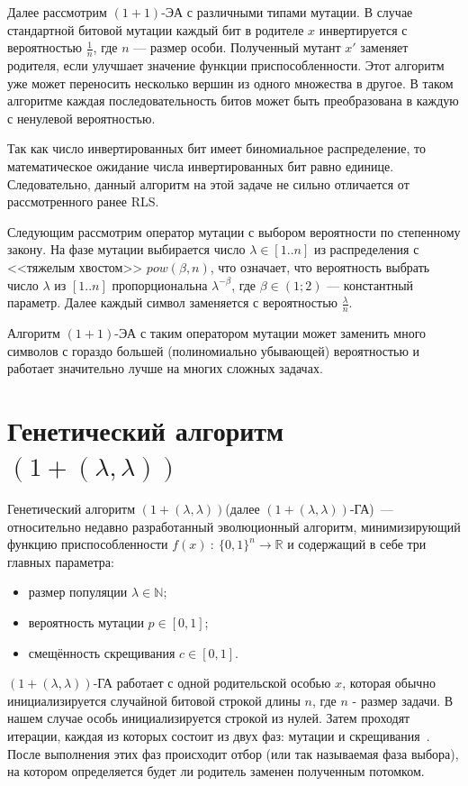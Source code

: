 \documentclass[times]{itmo-student-thesis}
\newcommand{\alglambda}{${(1 + (\lambda , \lambda))}$\xspace}
\newcommand{\alglambdaf}{${(1 + (\lambda , \lambda))}$-ГА\xspace}
\newcommand{\oea}{\mbox{$(1 + 1)$-ЭА}\xspace}
\newcommand{\N}{{\mathbb N}}
\newcommand{\R}{{\mathbb R}}
\begin{document}
Далее рассмотрим \oea с различными типами мутации. В случае стандартной битовой мутации каждый бит в родителе $x$ инвертируется с вероятностью $\frac{1}{n}$, где $n$ --- размер особи.
Полученный мутант $x'$ заменяет родителя, если улучшает значение функции приспособленности.
Этот алгоритм уже может переносить несколько вершин из одного множества в другое. В таком алгоритме каждая последовательность битов может быть преобразована в каждую с ненулевой вероятностью.

Так как число инвертированных бит имеет биномиальное распределение, то математическое ожидание числа инвертированных бит равно единице.
Следовательно, данный алгоритм на этой задаче не сильно отличается от рассмотренного ранее RLS.

Следующим рассмотрим оператор мутации с выбором вероятности по степенному закону. На фазе мутации выбирается число $\lambda \in [1..n]$ из распределения с <<тяжелым хвостом>> $pow(\beta, n)$, что означает, что  вероятность выбрать число $\lambda$ из $[1..n]$ пропорциональна $\lambda^{-\beta}$, где $\beta \in (1; 2)$ --- константный параметр.
Далее каждый символ заменяется с вероятностью $\frac{\lambda}{n}$.

Алгоритм \oea с таким оператором мутации может заменить много символов с гораздо большей (полиномиально убывающей) вероятностью и работает значительно лучше на многих сложных задачах.

\section{Генетический алгоритм \alglambda}

Генетический алгоритм \alglambda(далее \alglambdaf)~--- относительно недавно разработанный эволюционный алгоритм, минимизирующий функцию приспособленности $f(x)~:~\{0, 1\}^n \rightarrow \R$ и содержащий в себе три главных параметра:
\begin{itemize}
   \item размер популяции $\lambda \in \N$;
   \item вероятность мутации $p \in [0, 1]$;
   \item смещённость скрещивания $c \in [0, 1]$.
\end{itemize}
\alglambdaf работает с одной родительской особью $x$, которая обычно инициализируется случайной битовой строкой длины $n$, где $n$ - размер задачи. В нашем случае особь инициализируется строкой из нулей. Затем проходят итерации, каждая из которых состоит из двух фаз: мутации и скрещивания~\cite{DoerrDE15}. После выполнения этих фаз происходит отбор (или так называемая фаза выбора), на котором определяется будет ли родитель заменен полученным потомком.
\end{document}
